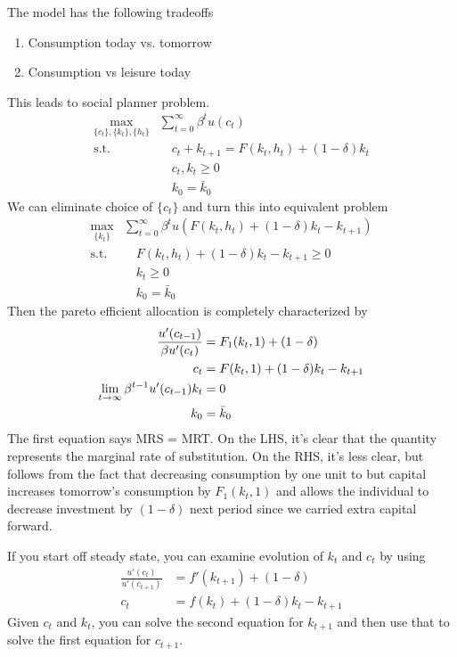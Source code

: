 \documentclass[12pt]{article}
\theoremstyle{plain}
\theoremstyle{definition}
\theoremstyle{remark}
\newcommand{\limt}{\lim_{t\rightarrow\infty}}
\newcommand{\sumtinfz}{\sum^\infty_{t=0}}
\begin{document}
The model has the following tradeoffs
\begin{enumerate}
  \item Consumption today vs. tomorrow
  \item Consumption vs leisure today
\end{enumerate}
This leads to social planner problem.
\begin{align*}
  \max_{\{c_t\},\{k_t\},\{h_t\}}
    &\sumtinfz \beta^t u(c_t) \\
    \text{s.t.} &\quad
    c_t + k_{t+1}
    = F(k_t,h_t) + (1-\delta) k_t\\
    &\quad c_t, k_t \geq 0 \\
    &\quad k_0 = \bar{k}_0
\end{align*}
We can eliminate choice of $\{c_t\}$ and turn this into equivalent
problem
\begin{align*}
  \max_{\{k_t\}}
    &\sumtinfz \beta^t
      u\left(F(k_t,h_t) + (1-\delta) k_t - k_{t+1}\right) \\
    \text{s.t.} &\quad
    F(k_t,h_t) + (1-\delta) k_t - k_{t+1} \geq 0 \\
    & \quad k_t \geq 0 \\
    &\quad k_0 = \bar{k}_0
\end{align*}
Then the pareto efficient allocation is completely characterized by
\begin{align}
  \frac{u'(c_{t-1})}{\beta u'(c_{t})}
  &= F_1(k_t,1) + (1-\delta) \notag \\
  c_t &= F(k_t,1) + (1-\delta)k_t - k_{t+1}\notag\\
  \limt \beta^{t-1}u'(c_{t-1}) k_t &= 0 \notag\\
  k_0 &= \bar{k}_0\notag
\end{align}
The first equation says MRS = MRT. On the LHS, it's clear that the
quantity represents the marginal rate of substitution. On the RHS, it's
less clear, but follows from the fact that decreasing consumption by one
unit to but capital increases tomorrow's consumption by $F_1(k_t,1)$ and
allows the individual to decrease investment by $(1-\delta)$ next period
since we carried extra capital forward.

If you start off steady state, you can examine evolution of $k_t$ and
$c_t$ by using
\begin{align*}
  \frac{u'(c_t)}{u'(c_{t+1})} &= f'(k_{t+1}) + (1-\delta) \\
  c_t &= f(k_t) + (1-\delta) k_t - k_{t+1}
\end{align*}
Given $c_t$ and $k_t$, you can solve the second equation for $k_{t+1}$
and then use that to solve the first equation for $c_{t+1}$.
\end{document}
